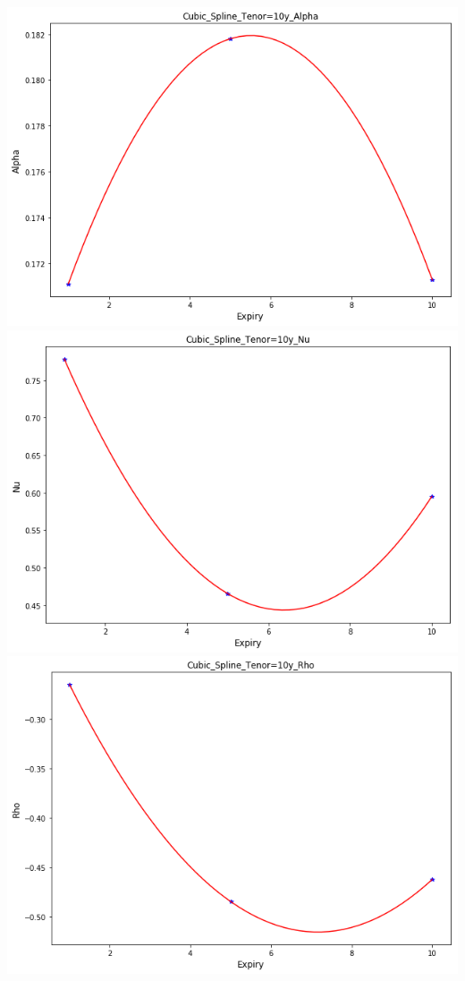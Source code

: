 \documentclass{article}
\begin{document}
\includegraphics[scale=0.4]{./images/Alpha_10y}\\
\includegraphics[scale=0.4]{./images/Nu_10y}\\
\includegraphics[scale=0.4]{./images/Rho_10y}\\
\end{document}
